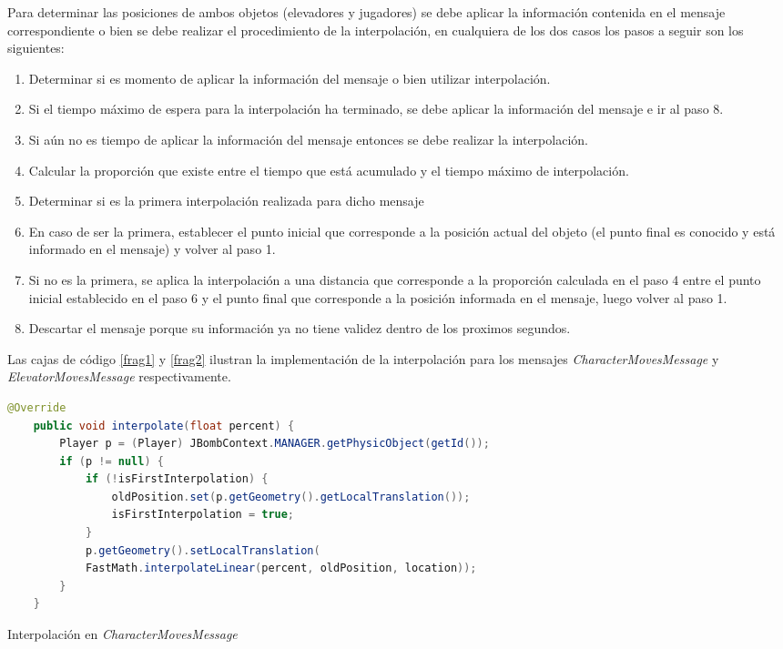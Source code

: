 \documentclass[a4paper,12pt,openany,oneside]{book}
\begin{document}
Para determinar las posiciones de ambos objetos (elevadores y jugadores) se debe aplicar la información contenida en el mensaje correspondiente o bien se debe realizar el procedimiento de la interpolación, en cualquiera de los dos casos los pasos a seguir son los siguientes:
\begin{enumerate}
\item Determinar si es momento de aplicar la información del mensaje o bien utilizar interpolación.
\item Si el tiempo máximo de espera para la interpolación ha terminado, se debe aplicar la información del mensaje e ir al paso 8.
\item Si aún no es tiempo de aplicar la información del mensaje entonces se debe realizar la interpolación.
\item Calcular la proporción que existe entre el tiempo que está acumulado y el tiempo máximo de interpolación.
\item Determinar si es la primera interpolación realizada para dicho mensaje
\item En caso de ser la primera, establecer el punto inicial que corresponde a la posición actual del objeto (el punto final es conocido y está informado en el mensaje) y volver al paso 1.
\item Si no es la primera, se aplica la interpolación a una distancia que corresponde a la proporción calculada en el paso 4 entre el punto inicial establecido en el paso 6 y el punto final que corresponde a la posición informada en el mensaje, luego volver al paso 1.
\item Descartar el mensaje porque su información ya no tiene validez dentro de los proximos segundos.
\end{enumerate}
Las cajas de código \ref{frag1} y \ref{frag2} ilustran la implementación de la interpolación para los mensajes \textit{CharacterMovesMessage} y \textit{ElevatorMovesMessage} respectivamente.
\begin{codigo}
\begin{lstlisting}[language=Java,frame=single,basicstyle=\scriptsize]
	@Override
    public void interpolate(float percent) {
        Player p = (Player) JBombContext.MANAGER.getPhysicObject(getId());
        if (p != null) {
            if (!isFirstInterpolation) {
                oldPosition.set(p.getGeometry().getLocalTranslation());
                isFirstInterpolation = true;
            }
            p.getGeometry().setLocalTranslation(
            FastMath.interpolateLinear(percent, oldPosition, location));
        }
    }
\end{lstlisting}
\caption{Interpolación en \textit{CharacterMovesMessage}}
\label{frag1}
\end{codigo}
\end{document}
